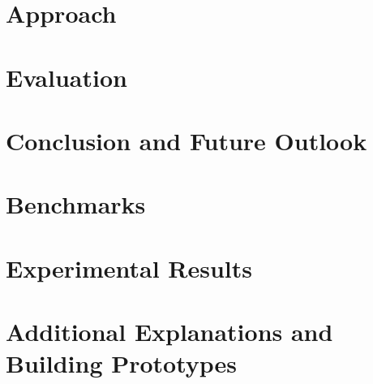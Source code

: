 \documentclass[longdoc,accentcolor=tud1b,12pt,paper=a4]{tudreport}
\newcounter{dummy} %
\begin{document}
	\chapter{Approach \label{approach_ch}}
	
	
	\chapter{Evaluation \label{eval_ch}}	
	
	
	\chapter{Conclusion and Future Outlook}
	
	
	\cleardoublepage

	

	\newpage
	\begin{appendices}
	\chapter{Benchmarks}
		
	\chapter{Experimental Results \label{appendixb}}
	
	\chapter{Additional Explanations and Building Prototypes \label{appendixc}}
	
	\end{appendices}	
	
\end{document}
